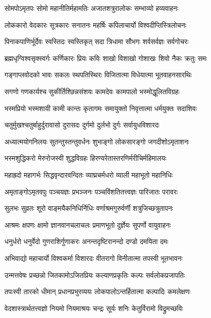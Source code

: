 \twolineshloka
{सोमपोऽमृतपः सोमो महानीतिर्महामतिः}
{अजातशत्रुरालोकः सम्भाव्यो हव्यवाहनः}

\twolineshloka
{लोककारो वेदकारः सूत्रकारः सनातनः}
{महर्षिः कपिलाचार्यो विश्वदीप्तिस्त्रिलोचनः}

\twolineshloka
{पिनाकपाणिर्भूर्देवः स्वस्तिदः स्वस्तिकृत् सदा}
{त्रिधामा सौभगः शर्वसर्वज्ञः सर्वगोचरः}

\twolineshloka
{ब्रह्मधृग्विश्वसृक्स्वर्गः कर्णिकारः प्रियः कविः}
{शाखो विशाखो गोशाखः शिवो नैकः क्रतुः समः}

\twolineshloka
{गङ्गाप्लवोदको भावः सकलः स्थपतिस्थिरः}
{विजितात्मा विधेयात्मा भूतवाहनसारथिः}

\twolineshloka
{सगणो गणकार्यश्च सुकीर्तिश्छिन्नसंशयः}
{कामदेवः कामपालो भस्मोद्धूलितविग्रहः}

\twolineshloka
{भस्मप्रियो भस्मशायी कामी कान्तः कृतागमः}
{समायुक्तो निवृत्तात्मा धर्मयुक्तः सदाशिवः}

\twolineshloka
{चतुर्मुखश्चतुर्बाहुर्दुरावासो दुरासदः}
{दुर्गमो दुर्लभो दुर्गः सर्वायुधविशारदः}

\twolineshloka
{अध्यात्मयोगनिलयः सुतन्तुस्तन्तुवर्धनः}
{शुभाङ्गो लोकसारङ्गो जगदीशोऽमृताशनः}

\twolineshloka
{भस्मशुद्धिकरो मेरुरोजस्वी शुद्धविग्रहः}
{हिरण्यरेतास्तरणिर्मरीचिर्महिमालयः}

\twolineshloka
{महाह्रदो महागर्भः सिद्धवृन्दारवन्दितः}
{व्याघ्रचर्मधरो व्याली महाभूतो महानिधिः}

\twolineshloka
{अमृताङ्गोऽमृतवपुः पञ्चयज्ञः प्रभञ्जनः}
{पञ्चविंशतितत्त्वज्ञः पारिजातः परावरः}

\twolineshloka
{सुलभः सुव्रतः शूरो वाङ्मयैकनिधिर्निधिः}
{वर्णाश्रमगुरुर्वर्णी शत्रुजिच्छत्रुतापनः}

\twolineshloka
{आश्रमः क्षपणः क्षामो ज्ञानवानचलाचलः}
{प्रमाणभूतो दुर्ज्ञेयः सुपर्णो वायुवाहनः}

\twolineshloka
{धनुर्धरो धनुर्वेदो गुणराशिर्गुणाकरः}
{अनन्तदृष्टिरानन्दो दण्डो दमयिता दमः}

\twolineshloka
{अभिवाद्यो महाचार्यो विश्वकर्मा विशारदः}
{वीतरागो विनीतात्मा तपस्वी भूतभावनः}

\twolineshloka
{उन्मत्तवेषः प्रच्छन्नो जितकामोऽजितप्रियः}
{कल्याणप्रकृतिः कल्पः सर्वलोकप्रजापतिः}

\twolineshloka
{तपःस्वी तारको धीमान् प्रधानप्रभुरव्ययः}
{लोकपालोऽन्तर्हितात्मा कल्पादिः कमलेक्षणः}

\twolineshloka
{वेदशास्त्रार्थतत्त्वज्ञो नियमो नियमाश्रयः}
{चन्द्रः सूर्यः शनिः केतुर्विरामो विद्रुमच्छविः}

